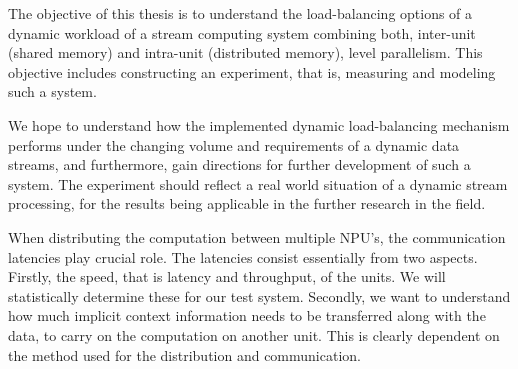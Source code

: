 The objective of this thesis is to understand the load-balancing options of a dynamic workload of a stream computing system combining both, inter-unit (shared memory) and intra-unit (distributed memory), level parallelism. This objective includes constructing an experiment, that is, measuring and modeling  such a system.

We hope to understand how the implemented dynamic load-balancing mechanism performs under the changing volume and requirements of a dynamic data streams, and furthermore, gain directions for further development of such a system. The experiment should reflect a real world situation of a dynamic stream processing, for the results being applicable in the further research in the field.

When distributing the computation between multiple NPU's, the communication latencies play crucial role. The latencies consist essentially from two aspects. Firstly, the speed, that is latency and throughput, of the units. We will statistically determine these for our test system. Secondly, we want to understand how much implicit context information needs to be transferred along with the data, to carry on the computation on another unit. This is clearly dependent on the method used for the distribution and communication.


